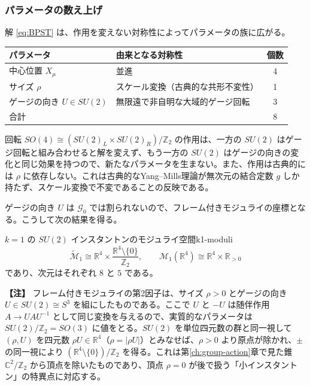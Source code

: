 \documentclass[uplatex, dvipdfmx, book]{jsbook}
\let\origsubsubsection\subsubsection
\renewcommand{\subsection}{\origsubsubsection}
\renewcommand{\subsubsection}{\paragraph}
\newenvironment{note}{\vspace{1ex}\par\footnotesize\noindent\textbf{【注】}}{\par\vspace{1ex}}
\begin{document}
\subsection{パラメータの数え上げ}

解 \eqref{eq:BPST} は、作用を変えない対称性によってパラメータの族に広がる。
\begin{center}
\begin{tabular}{llc}
    \hline
    パラメータ & 由来となる対称性 & 個数 \\
    \hline
    中心位置 $X_\mu$ & 並進 & 4 \\
    サイズ $\rho$ & スケール変換（古典的な共形不変性） & 1 \\
    ゲージの向き $U \in SU(2)$ & 無限遠で非自明な大域的ゲージ回転 & 3 \\
    \hline
    合計 & & 8 \\
    \hline
\end{tabular}
\end{center}
回転 $SO(4) \cong (SU(2)_L \times SU(2)_R)/\mathbb{Z}_2$ の作用は、一方の $SU(2)$ はゲージ回転と組み合わせると解を変えず、もう一方の $SU(2)$ はゲージの向きの変化と同じ効果を持つので、新たなパラメータを生まない。また、作用は古典的には $\rho$ に依存しない。これは古典的なYang--Mills理論が無次元の結合定数 $g$ しか持たず、スケール変換で不変であることの反映である。

ゲージの向き $U$ は $\mathcal{G}_0$ では割られないので、フレーム付きモジュライの座標となる。こうして次の結果を得る。

\begin{myprop}{$k = 1$ の $SU(2)$ インスタントンのモジュライ空間}{k1-moduli}
\begin{equation*}
    \widetilde{\mathcal{M}}_1 \cong \mathbb{R}^4 \times \frac{\mathbb{R}^4 \setminus \{0\}}{\mathbb{Z}_2}, \qquad
    \mathcal{M}_1(\mathbb{R}^4) \cong \mathbb{R}^4 \times \mathbb{R}_{>0}
\end{equation*}
であり、次元はそれぞれ $8$ と $5$ である。
\end{myprop}

\begin{note}
フレーム付きモジュライの第2因子は、サイズ $\rho > 0$ とゲージの向き $U \in SU(2) \cong S^3$ を組にしたものである。ここで $U$ と $-U$ は随伴作用 $A \to UAU^{-1}$ として同じ変換を与えるので、実質的なパラメータは $SU(2)/\mathbb{Z}_2 = SO(3)$ に値をとる。$SU(2)$ を単位四元数の群と同一視して $(\rho, U)$ を四元数 $\rho U \in \mathbb{R}^4$（$\rho = |\rho U|$）とみなせば、$\rho > 0$ より原点が除かれ、$\pm$ の同一視により $(\mathbb{R}^4 \setminus \{0\})/\mathbb{Z}_2$ を得る。これは第\ref{ch:group-action}章で見た錐 $\mathbb{C}^2/\mathbb{Z}_2$ から頂点を除いたものであり、頂点 $\rho = 0$ が後で扱う「小インスタントン」の特異点に対応する。
\end{note}
\end{document}
